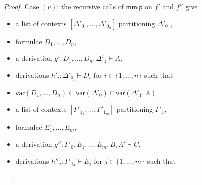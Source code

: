 \documentclass[a4paper,UKenglish,cleveref,autoref,thm-restate, anonymous]{lipics-v2021}
\newcommand{\mf}[1]{\mathsf{#1}}
\newcommand{\vars}[1]{\mf{var} (#1)}
\newcommand{\GG}{\Gamma}
\newcommand{\GD}{\Delta}
\newcommand{\GL}{\Lambda}
\newcommand{\vd}{\vdash}
\begin{document}
\begin{proof}
  Case $(v)$: %
  the recursive calls of $\mf{mmip}$ on $f'$ and $f''$ give
  \begin{itemize}
  \item a list of contexts $[\GD'_{0_1}, \dots , \GD'_{0_n}]$ partitioning $\GD'_0$ ,
  \item formulae $D_1,\dots,D_n$,
  \item a derivation $g' : D_1,\dots,D_n , \GD'_1 \vd A$,
  \item derivations $h'_i : \GD'_{0_i} \vdash D_i$ for $i \in \{1,\dots,n\}$ such that
    \item $\vars{D_1 , \dots, D_n} \subseteq \vars{\GD'_0} \cap \vars{\GD'_1, A}$
  \end{itemize}
  \begin{itemize}
  \item a list of contexts $[\GG'_{1_1}, \dots , \GG'_{1_m}]$ partitioning $\GG'_1$,
  \item formulae $E_1, \dots,E_m$,
  \item a derivation $g'' : \GG'_0 , E_1, \dots,E_m, B , \GL' \vd C$,
  \item derivations $h''_j : \GG'_{1j} \vdash E_j$ for $j\in\{1,\dots,m\}$ such that

\end{itemize}
\end{proof}
\end{document}
